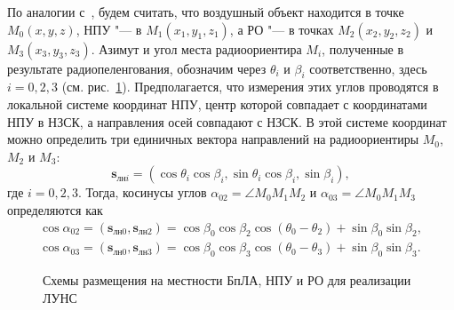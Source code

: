 \documentclass[../main.tex]{subfiles}
\begin{document}
По аналогии с~\cite{WMMU:2019:IIS}, будем считать, что воздушный объект находится в точке $M_0\left(x, y, z\right)$, НПУ "--- в $M_1\left(x_1, y_1, z_1\right)$, а РО "--- в точках $M_2\left(x_2, y_2, z_2\right)$ и $M_3\left(x_3, y_3, z_3\right)$. Азимут и угол места радиоориентира $M_i$, полученные в результате радиопеленгования, обозначим через $\theta_i$ и $\beta_i$ соответственно, здесь $i = 0, 2, 3$ (см. рис.~\ref{fig:systems:pic1}). Предполагается, что измерения этих углов проводятся в локальной системе координат НПУ, центр которой совпадает с координатами НПУ в НЗСК, а направления осей совпадают с НЗСК. В этой системе координат можно определить три единичных вектора направлений на радиоориентиры $M_0$, $M_2$ и $M_3$:
\begin{equation*}
  \mathbf{s}_{\text{лн}i} = \left(\cos\theta_i \cos\beta_i, \sin\theta_i\cos\beta_i, \sin\beta_i\right),
\end{equation*}
где $i = 0, 2, 3$. Тогда, косинусы углов $\alpha_{02} = \angle M_0 M_1 M_2$ и $\alpha_{03} = \angle M_0 M_1 M_3$ определяются как
\begin{align*}
  \cos\alpha_{02} = \left(\mathbf{s}_{\text{лн}0}, \mathbf{s}_{\text{лн}2}\right) =
  \cos\beta_0 \cos\beta_2 \cos\left(\theta_0 - \theta_2\right) + \sin\beta_0 \sin\beta_2, \\
  \cos\alpha_{03} = \left(\mathbf{s}_{\text{лн}0}, \mathbf{s}_{\text{лн}3}\right) =
  \cos\beta_0 \cos\beta_3 \cos\left(\theta_0 - \theta_3\right) + \sin\beta_0 \sin\beta_3.
\end{align*}

\begin{figure}[htbp]
  \centering


  \caption{Схемы размещения на местности БпЛА, НПУ и РО для реализации ЛУНС}
  \label{fig:systems:pic1}
\end{figure}
\end{document}
